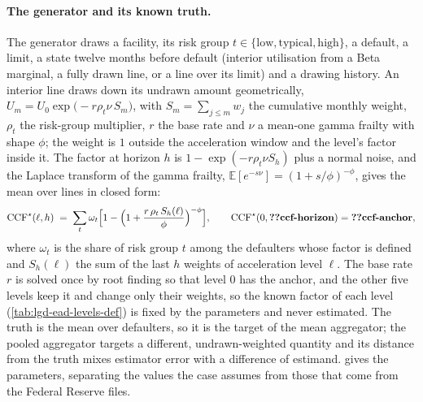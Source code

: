 \paragraph{The generator and its known truth.} The generator draws a facility, its risk group $t\in\{\text{low},\text{typical},\text{high}\}$, a default, a limit, a state twelve months before default (interior utilisation from a Beta marginal, a fully drawn line, or a line over its limit) and a drawing history. An interior line draws down its undrawn amount geometrically, $U_m=U_0\exp\bigl(-r\rho_t\nu\,S_m\bigr)$, with $S_m=\sum_{j\le m}w_j$ the cumulative monthly weight, $\rho_t$ the risk-group multiplier, $r$ the base rate and $\nu$ a mean-one gamma frailty with shape $\phi$; the weight is $1$ outside the acceleration window and the level's factor inside it. The factor at horizon $h$ is $1-\exp(-r\rho_t\nu S_h)$ plus a normal noise, and the Laplace transform of the gamma frailty, $\mathbb{E}[e^{-s\nu}]=(1+s/\phi)^{-\phi}$, gives the mean over lines in closed form:
\begin{equation}
\mathrm{CCF}^{\star}(\ell,h)\;=\;\sum_{t}\omega_t\Bigl[1-\Bigl(1+\frac{r\,\rho_t\,S_h(\ell)}{\phi}\Bigr)^{-\phi}\Bigr],\qquad \mathrm{CCF}^{\star}(0,\LE{ccf-horizon})=\LE{ccf-anchor},
\label{eq:lgd-ead-truth}
\end{equation}
where $\omega_t$ is the share of risk group $t$ among the defaulters whose factor is defined and $S_h(\ell)$ the sum of the last $h$ weights of acceleration level $\ell$. The base rate $r$ is solved once by root finding so that level $0$ has the anchor, and the other five levels keep it and change only their weights, so the known factor of each level (\cref{tab:lgd-ead-levels-def}) is fixed by the parameters and never estimated. The truth is the mean over defaulters, so it is the target of the mean aggregator; the pooled aggregator targets a different, undrawn-weighted quantity and its distance from the truth mixes estimator error with a difference of estimand.  gives the parameters, separating the values the case assumes from those that come from the Federal Reserve files.




